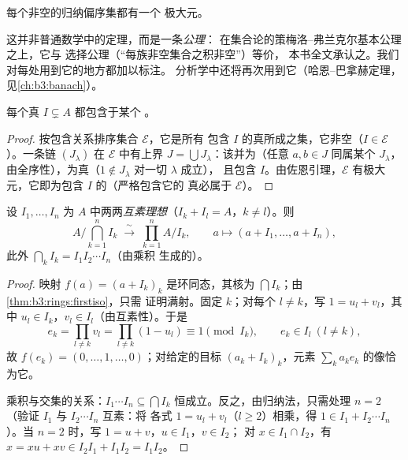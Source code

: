 \begin{theorem}[佐恩引理]\label{thm:b3:rings:zorn}
每个非空的归纳偏序集都有一个
极大元。
\admitted
\end{theorem}

\begin{remark}\label{rem:b3:rings:zorn}
这并非普通数学中的定理，而是一条\emph{公理}：
在集合论的策梅洛–弗兰克尔基本公理之上，它与
选择公理（“每族非空集合之积非空”）等价，
本书全文承认之。我们对每处用到它的地方都加以标注。
分析学中还将再次用到它（哈恩–巴拿赫定理，
见\cref{ch:b3:banach}）。
\end{remark}

\begin{theorem}[克鲁尔定理]\label{thm:b3:rings:krull}
每个真 $I \subsetneq A$ 都包含于某个
。
\end{theorem}

\begin{proof}
按包含关系排序集合 $\mathcal E$，它是所有
包含 $I$ 的真所成之集，它非空（$I \in \mathcal E$）。一条链
$(J_\lambda)$ 在 $\mathcal E$ 中有上界 $J = \bigcup
J_\lambda$：该并为（任意 $a, b \in J$ 同属某个 $J_\lambda$，
由全序性），为真（$1 \notin J_\lambda$ 对一切 $\lambda$ 成立），
且包含 $I$。由佐恩引理，$\mathcal
E$ 有极大元，它即为包含 $I$ 的（严格包含它的
真必属于 $\mathcal E$）。
\end{proof}

\begin{theorem}[中国剩余定理]\label{thm:b3:rings:crt}
设 $I_1, \dots, I_n$ 为 $A$ 中两两\emph{互素理想}（$I_k + I_l = A$，$k \neq l$）。则
\[
A\Big/\bigcap_{k=1}^n I_k \;\xrightarrow{\;\sim\;}\;
\prod_{k=1}^n A/I_k,
\qquad
a \longmapsto (a + I_1, \dots, a + I_n),
\]
此外 $\bigcap_k I_k = I_1 I_2 \cdots I_n$（由乘积
生成的）。
\end{theorem}

\begin{proof}
映射 $f(a) = (a + I_k)_k$ 是环同态，其核为
$\bigcap I_k$；由\cref{thm:b3:rings:firstiso}，只需
证明满射。固定 $k$；对每个 $l \neq k$，写 $1 = u_l +
v_l$，其中 $u_l \in I_k$，$v_l \in I_l$（由互素性）。于是
\[
e_k = \prod_{l \neq k} v_l = \prod_{l\neq k}(1 - u_l)
\equiv 1 \pmod{I_k},
\qquad e_k \in I_l \ (l \neq k),
\]
故 $f(e_k) = (0, \dots, 1, \dots, 0)$；对给定的目标 $(a_k +
I_k)_k$，元素 $\sum_k a_k e_k$ 的像恰为它。

乘积与交集的关系：$I_1\cdots I_n \subseteq \bigcap I_k$
恒成立。反之，由归纳法，只需处理 $n = 2$
（验证 $I_1$ 与 $I_2\cdots I_n$ 互素：将
各式 $1 = u_l + v_l$（$l \geq 2$）相乘，得 $1 \in I_1 + I_2\cdots
I_n$）。当 $n = 2$ 时，写 $1 = u + v$，$u \in I_1$，$v \in I_2$；
对 $x \in I_1 \cap I_2$，有 $x = xu + xv \in I_2I_1 + I_1I_2 =
I_1I_2$。
\end{proof}

